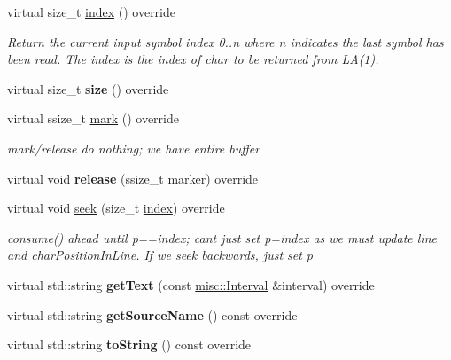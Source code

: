 \begin{DoxyCompactItemize}
\item 
virtual size\+\_\+t \hyperlink{classantlr4_1_1ANTLRInputStream_a4c9a7beab5662a33a537fa49fc27db9f}{index} () override
\begin{DoxyCompactList}\small\item\em Return the current input symbol index 0..n where n indicates the last symbol has been read. The index is the index of char to be returned from L\+A(1). \end{DoxyCompactList}\item 
\mbox{\label{classantlr4_1_1ANTLRInputStream_ae96b37a6b345a0f637058890d4c97cf6}} 
virtual size\+\_\+t {\bfseries size} () override
\item 
virtual ssize\+\_\+t \hyperlink{classantlr4_1_1ANTLRInputStream_a5a1520d6417bef7e06cb8d524ec6f76c}{mark} () override
\begin{DoxyCompactList}\small\item\em mark/release do nothing; we have entire buffer \end{DoxyCompactList}\item 
\mbox{\label{classantlr4_1_1ANTLRInputStream_ab376abfc892d24098cc45fc3917acac0}} 
virtual void {\bfseries release} (ssize\+\_\+t marker) override
\item 
virtual void \hyperlink{classantlr4_1_1ANTLRInputStream_ac46f2e88f0772bc65b537781a2341010}{seek} (size\+\_\+t \hyperlink{classantlr4_1_1ANTLRInputStream_a4c9a7beab5662a33a537fa49fc27db9f}{index}) override
\begin{DoxyCompactList}\small\item\em consume() ahead until p==index; can\textquotesingle{}t just set p=index as we must update line and char\+Position\+In\+Line. If we seek backwards, just set p \end{DoxyCompactList}\item 
\mbox{\label{classantlr4_1_1ANTLRInputStream_a24450f62298de76d6a8bc251540d79c2}} 
virtual std\+::string {\bfseries get\+Text} (const \hyperlink{classantlr4_1_1misc_1_1Interval}{misc\+::\+Interval} \&interval) override
\item 
\mbox{\label{classantlr4_1_1ANTLRInputStream_a4f2208f3974b6c153bf561d0addb88f3}} 
virtual std\+::string {\bfseries get\+Source\+Name} () const override
\item 
\mbox{\label{classantlr4_1_1ANTLRInputStream_a93b3e3b667734ad0c4cf4c5058e9b7cb}} 
virtual std\+::string {\bfseries to\+String} () const override
\end{DoxyCompactItemize}

